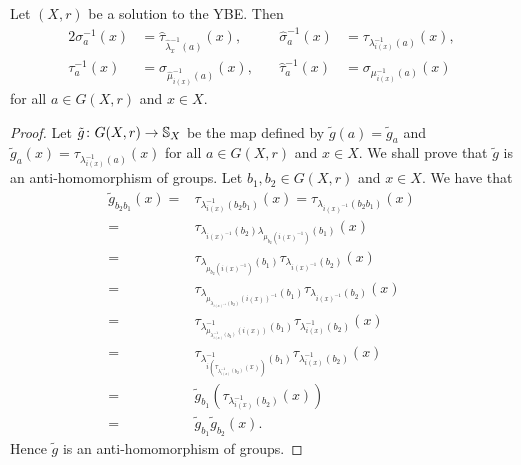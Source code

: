 \begin{lemma}\label{lem:permutationlemma}
	Let $(X,r)$ be a solution to the YBE. Then
 	\begin{alignat*}{2}
		\sigma_a^{-1}(x) &=\widehat{\tau}_{\widehat{\lambda}_x^{-1}(a)}(x),\quad
		& \widehat{\sigma}_a^{-1}(x) &=\tau_{\lambda_{i(x)}^{-1}(a)}(x),\\
		\tau_a^{-1}(x) &=\widehat{\sigma}_{\widehat{\mu}_{i(x)}^{-1}(a)}(x),\quad
		& \hat{\tau}_a^{-1}(x) &=\sigma_{\mu_{i(x)}^{-1}(a)}(x)
 	\end{alignat*}
 	for all $a\in G(X,r)$ and $x\in X$.
 	\begin{proof}
		Let $\tilde{g}\colon G(X,r)\to\mathbb{S}_X$ be the map defined by $\tilde{g}(a)=\tilde{g}_a$
		and $\tilde{g}_a(x)=\tau_{\lambda_{i(x)}^{-1}(a)}(x)$ for all $a\in G(X,r)$ and $x\in X$. We shall prove that $\tilde{g}$ is an anti-homomorphism
		of groups. 
		Let $b_1,b_2\in G(X,r)$ and $x\in X$. We have that
		\begin{align*}
			\tilde{g}_{b_2b_1}(x)=&\tau_{\lambda^{-1}_{i(x)}(b_2b_1)}(x)=\tau_{\lambda_{i(x)^{-1}}(b_2b_1)}(x)\\
			=&\tau_{\lambda_{i(x)^{-1}}(b_2)\lambda_{\mu_{b_2}(i(x)^{-1})}(b_1)}(x)\\
			=&\tau_{\lambda_{\mu_{b_2}(i(x)^{-1})}(b_1)}\tau_{\lambda_{i(x)^{-1}}(b_2)}(x)\\
			=&\tau_{\lambda_{\mu_{\lambda_{i(x)^{-1}}(b_2)}(i(x))^{-1}}(b_1)}\tau_{\lambda_{i(x)^{-1}}(b_2)}(x)\\
			=&\tau_{\lambda^{-1}_{\mu_{\lambda^{-1}_{i(x)}(b_2)}(i(x))}(b_1)}\tau_{\lambda^{-1}_{i(x)}(b_2)}(x)\\
			=&\tau_{\lambda^{-1}_{i(\tau_{\lambda^{-1}_{i(x)}(b_2)}(x))}(b_1)}\tau_{\lambda^{-1}_{i(x)}(b_2)}(x)\\
			=&\tilde{g}_{b_1}(\tau_{\lambda^{-1}_{i(x)}(b_2)}(x))\\
			=&\tilde{g}_{b_1}\tilde{g}_{b_2}(x).
		\end{align*}
		Hence $\tilde{g}$ is an anti-homomorphism of groups.
		
		
		

\end{proof}
\end{lemma}

